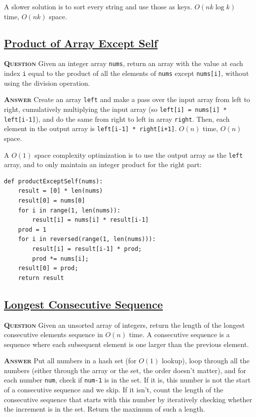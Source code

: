 \documentclass[table, xcdraw]{article}%
\begin{document}
A slower solution is to sort every string and use those as keys. $O(nk\log k)$ time, $O(nk)$ space.

\subsection{\href{https://leetcode.com/problems/product-of-array-except-self}{Product of Array Except Self}}

\textsc{\textbf{Question}} Given an integer array \texttt{nums}, return an array with the value at each index \texttt{i} equal to the product of all the elements of \texttt{nums} except \texttt{nums[i]}, without using the division operation.

\textsc{\textbf{Answer}} Create an array \texttt{left} and make a pass over the input array from left to right, cumulatively multiplying the input array (so \texttt{left[i] = nums[i] * left[i-1]}), and do the same from right to left in array \texttt{right}. Then, each element in the output array is \texttt{left[i-1] * right[i+1]}. $O(n)$ time, $O(n)$ space.

A $O(1)$ space complexity optimization is to use the output array as the \texttt{left} array, and to only maintain an integer product for the right part:

\begin{verbatim}
def productExceptSelf(nums):
    result = [0] * len(nums)
    result[0] = nums[0]
    for i in range(1, len(nums)):
        result[i] = nums[i] * result[i-1]
    prod = 1
    for i in reversed(range(1, len(nums))):
        result[i] = result[i-1] * prod;
        prod *= nums[i];
    result[0] = prod;
    return result
\end{verbatim}

\subsection{\href{https://leetcode.com/problems/longest-consecutive-sequence}{Longest Consecutive Sequence}}

\textsc{\textbf{Question}} Given an unsorted array of integers, return the length of the longest consecutive elements sequence in $O(n)$ time. A consecutive sequence is a sequence where each subsequent element is one larger than the previous element.

\textsc{\textbf{Answer}} Put all numbers in a hash set (for $O(1)$ lookup), loop through all the numbers (either through the array or the set, the order doesn't matter), and for each number \texttt{num}, check if \texttt{num-1} is in the set. If it is, this number is not the start of a consecutive sequence and we skip. If it isn't, count the length of the consecutive sequence that starts with this number by iteratively checking whether the increment is in the set. Return the maximum of such a length.
\end{document}
